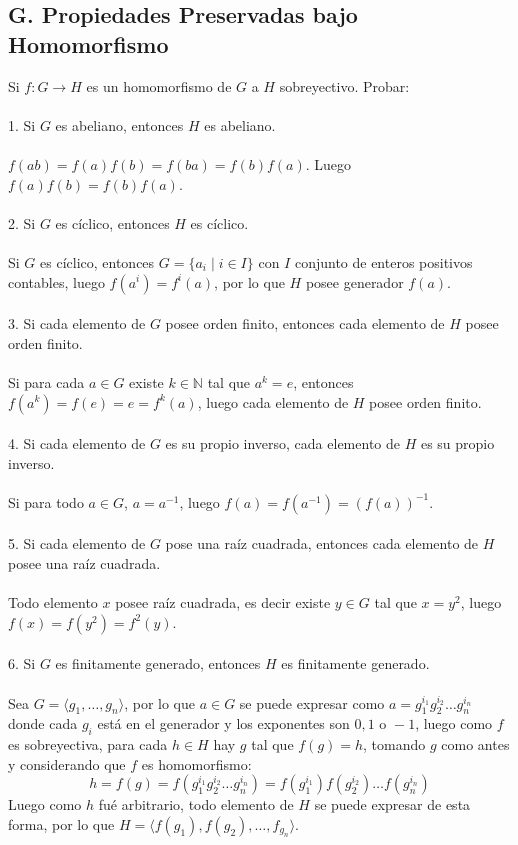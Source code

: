 \documentclass{article}
\begin{document}
\subsection*{G. Propiedades Preservadas bajo Homomorfismo}
Si $f: G \to H$ es un homomorfismo de $G$ a $H$ sobreyectivo. Probar:
\\
\\
1. Si $G$ es abeliano, entonces $H$ es abeliano.
\\
\\
$f(ab)=f(a)f(b)=f(ba)=f(b)f(a)$. Luego $f(a)f(b)=f(b)f(a)$.
\\
\\
2. Si $G$ es cíclico, entonces $H$ es cíclico.
\\
\\
Si $G$ es cíclico, entonces $G=\{a_{i} \mid i \in I \}$ con $I$ conjunto de enteros positivos contables, luego $f(a^{i})=f^{i}(a)$, por lo que $H$ posee generador $f(a)$.
\\
\\
3. Si cada elemento de $G$ posee orden finito, entonces cada elemento de $H$ posee orden finito.
\\
\\
Si para cada $a \in G$ existe $k \in \mathbb{N}$ tal que $a^{k}=e$, entonces $f(a^{k})=f(e)=e=f^{k}(a)$, luego cada elemento de $H$ posee orden finito.
\\
\\
4. Si cada elemento de $G$ es su propio inverso, cada elemento de $H$ es su propio inverso.
\\
\\
Si para todo $a \in G$, $a=a^{-1}$, luego $f(a)=f(a^{-1})=(f(a))^{-1}$.
\\
\\
5. Si cada elemento de $G$ pose una raíz cuadrada, entonces cada elemento de $H$ posee una raíz cuadrada.
\\
\\
Todo elemento $x$ posee raíz cuadrada, es decir existe $y \in G$ tal que $x=y^{2}$, luego $f(x)=f(y^{2})=f^{2}(y)$.
\\
\\
6. Si $G$ es finitamente generado, entonces $H$ es finitamente generado.
\\
\\
Sea $G=\langle g_1, \dots, g_{n} \rangle$, por lo que $a \in G$ se puede expresar como $a=g_{1}^{i_1}g_{2}^{i_{2}}\dots g_{n}^{i_{n}}$ donde cada $g_{i}$ está en el generador y los exponentes son $0,1 \text{ o }-1$, luego como $f$ es sobreyectiva, para cada $h \in H$ hay $g$ tal que $f(g)=h$, tomando $g$ como antes y considerando que $f$ es homomorfismo:
\begin{equation*}
    h=f(g)=f(g_{1}^{i_1}g_{2}^{i_{2}}\dots g_{n}^{i_{n}})=f(g_{1}^{i_1})f(g_{2}^{i_{2}})\dots f(g_{n}^{i_{n}})
\end{equation*}
Luego como $h$ fué arbitrario, todo elemento de $H$ se puede expresar de esta forma, por lo que $H = \langle f(g_{1}),f(g_{2}),\dots,f_{g_{n}} \rangle$.
\end{document}
